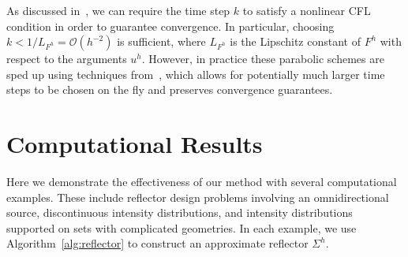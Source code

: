 \documentclass{amsart}
\newcommand{\norm}[1]{\left\Vert#1\right\Vert}
\newcommand{\bO}{\mathcal{O}}
\theoremstyle{lemma}
\theoremstyle{remark}
\begin{document}
As discussed in~\cite{ObermanSINUM}, we can require the time step $k$ to satisfy a nonlinear CFL condition in order to guarantee convergence. In particular, choosing $k < 1/L_{F^{h}} = \bO(h^{-2})$ is sufficient, where $L_{F^{h}}$ is the Lipschitz constant of $F^h$ with respect to the arguments $u^h$. However, in practice these parabolic schemes are sped up using techniques from~\cite{SchaefferHou}, which allows for potentially much larger time steps to be chosen on the fly and preserves convergence guarantees.





%
%
%
%
%


\section{Computational Results}\label{sec:numerics}
Here we demonstrate the effectiveness of our method with several computational examples. These include reflector design problems involving an omnidirectional source, discontinuous intensity distributions, and intensity distributions supported on sets with complicated geometries.  In each example, we use Algorithm~\ref{alg:reflector} to construct an approximate reflector $\Sigma^h$.  
\end{document}
